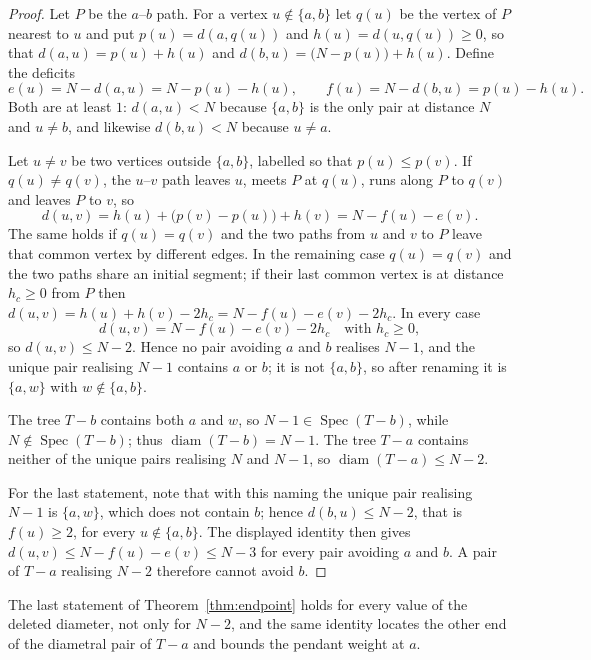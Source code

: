 \documentclass[11pt,a4paper]{article}
\theoremstyle{plain}
\theoremstyle{remark}
\newcommand{\diam}{\operatorname{diam}}
\newcommand{\Spec}{\operatorname{Spec}}
\begin{document}
\begin{proof}
Let $P$ be the $a$--$b$ path.  For a vertex $u\notin\{a,b\}$ let $q(u)$ be the
vertex of $P$ nearest to $u$ and put $p(u)=d(a,q(u))$ and $h(u)=d(u,q(u))\ge0$,
so that $d(a,u)=p(u)+h(u)$ and $d(b,u)=\bigl(N-p(u)\bigr)+h(u)$.  Define the
deficits
\[
  e(u)=N-d(a,u)=N-p(u)-h(u),\qquad f(u)=N-d(b,u)=p(u)-h(u).
\]
Both are at least $1$: $d(a,u)<N$ because $\{a,b\}$ is the only pair at distance
$N$ and $u\ne b$, and likewise $d(b,u)<N$ because $u\ne a$.

Let $u\ne v$ be two vertices outside $\{a,b\}$, labelled so that
$p(u)\le p(v)$.  If $q(u)\ne q(v)$, the $u$--$v$ path leaves $u$, meets $P$ at
$q(u)$, runs along $P$ to $q(v)$ and leaves $P$ to $v$, so
\[
  d(u,v)=h(u)+\bigl(p(v)-p(u)\bigr)+h(v)=N-f(u)-e(v).
\]
The same holds if $q(u)=q(v)$ and the two paths from $u$ and $v$ to $P$ leave
that common vertex by different edges.  In the remaining case
$q(u)=q(v)$ and the two paths share an initial segment; if their last common
vertex is at distance $h_c\ge0$ from $P$ then
$d(u,v)=h(u)+h(v)-2h_c=N-f(u)-e(v)-2h_c$.  In every case
\[
  d(u,v)=N-f(u)-e(v)-2h_c\quad\text{with } h_c\ge0,
\]
so $d(u,v)\le N-2$.  Hence no pair avoiding $a$ and $b$ realises $N-1$, and the
unique pair realising $N-1$ contains $a$ or $b$; it is not $\{a,b\}$, so after
renaming it is $\{a,w\}$ with $w\notin\{a,b\}$.

The tree $T-b$ contains both $a$ and $w$, so $N-1\in\Spec(T-b)$, while
$N\notin\Spec(T-b)$; thus $\diam(T-b)=N-1$.  The tree $T-a$ contains neither of
the unique pairs realising $N$ and $N-1$, so $\diam(T-a)\le N-2$.

For the last statement, note that with this naming the unique pair realising
$N-1$ is $\{a,w\}$, which does not contain $b$; hence $d(b,u)\le N-2$, that is
$f(u)\ge2$, for every $u\notin\{a,b\}$.  The displayed identity then gives
$d(u,v)\le N-f(u)-e(v)\le N-3$ for every pair avoiding $a$ and $b$.  A pair of
$T-a$ realising $N-2$ therefore cannot avoid $b$.
\end{proof}

The last statement of Theorem~\ref{thm:endpoint} holds for every value of the
deleted diameter, not only for $N-2$, and the same identity locates the other
end of the diametral pair of $T-a$ and bounds the pendant weight at $a$.
\end{document}
